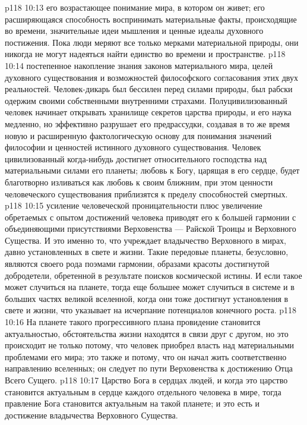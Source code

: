 \vs p118 10:13 \bibnobreakspace {} его возрастающее понимание мира, в котором он живет; его расширяющаяся способность воспринимать материальные факты, происходящие во времени, значительные идеи мышления и ценные идеалы духовного постижения. Пока люди меряют все только мерками материальной природы, они никогда не могут надеяться найти единство во времени и пространстве.
\vs p118 10:14 \pc {}\bibnobreakspace {} постепенное накопление знания законов материального мира, целей духовного существования и возможностей философского согласования этих двух реальностей. Человек\hyp{}дикарь был бессилен перед силами природы, был рабски одержим своими собственными внутренними страхами. Полуцивилизованный человек начинает открывать хранилище секретов царства природы, и его наука медленно, но эффективно разрушает его предрассудки, создавая в то же время новую и расширенную фактологическую основу для понимания значений философии и ценностей истинного духовного существования. Человек цивилизованный когда\hyp{}нибудь достигнет относительного господства над материальными силами его планеты; любовь к Богу, царящая в его сердце, будет благотворно изливаться как любовь к своим ближним, при этом ценности человеческого существования приблизятся к пределу способностей смертных.
\vs p118 10:15 \pc {}\bibnobreakspace {} усиление человеческой проницательности плюс увеличение обретаемых с опытом достижений человека приводят его к большей гармонии с объединяющими присутствиями Верховенства --- Райской Троицы и Верховного Существа. И это именно то, что учреждает владычество Верховного в мирах, давно установленных в свете и жизни. Такие передовые планеты, безусловно, являются своего рода поэмами гармонии, образами красоты достигнутой добродетели, обретенной в результате поисков космической истины. И если такое может случиться на планете, тогда еще большее может случиться в системе и в больших частях великой вселенной, когда они тоже достигнут установления в свете и жизни, что указывает на исчерпание потенциалов конечного роста.
\vs p118 10:16 \pc На планете такого прогрессивного плана провидение становится актуальностью, обстоятельства жизни находятся в связи друг с другом, но это происходит не только потому, что человек приобрел власть над материальными проблемами его мира; это также и потому, что он начал жить соответственно направлению вселенных; он следует по пути Верховенства к достижению Отца Всего Сущего.
\vs p118 10:17 \pc Царство Бога в сердцах людей, и когда это царство становится актуальным в сердце каждого отдельного человека в мире, тогда правление Бога становится актуальным на такой планете; и это есть и достижение владычества Верховного Существа.
